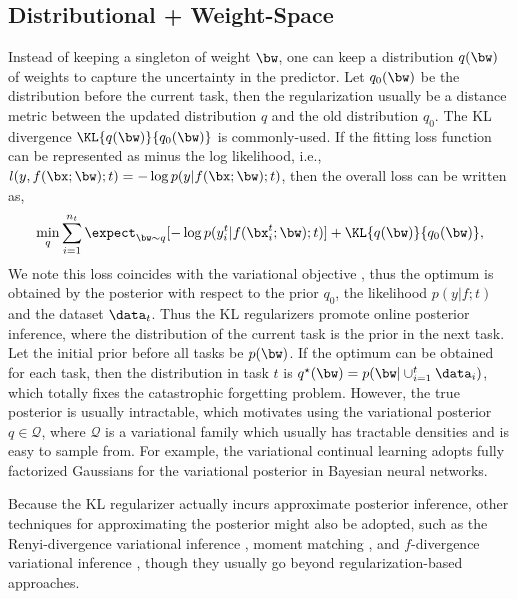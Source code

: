 \subsection{Distributional + Weight-Space}
Instead of keeping a singleton of weight $\bw$, one can keep a distribution $q(\bw)$ of weights to capture the uncertainty in the predictor. Let $q_0(\bw)$ be the distribution before the current task, then the regularization usually be a distance metric between the updated distribution $q$ and the old distribution $q_0$. The KL divergence $\KL{q(\bw)}{q_0(\bw)}$ is commonly-used. If the fitting loss function can be represented as minus the log likelihood, i.e., $l(y, f(\bx; \bw); t) = -\log p(y|f(\bx; \bw); t)$, then the overall loss can be written as,
\begin{align}
    \min_{q} \sum_{i=1}^{n_t} \expect_{\bw \sim q} [ -\log p(y_i^t|f(\bx_i^t; \bw); t) ] + \KL{q(\bw)}{q_0(\bw)},
\end{align}
We note this loss coincides with the variational objective \citep{wainwright2008graphical}, thus the optimum is obtained by the posterior with respect to the prior $q_0$, the likelihood $p(y|f; t)$ and the dataset $\data_t$. Thus the KL regularizers promote online posterior inference, where the distribution of the current task is the prior in the next task. Let the initial prior before all tasks be $p(\bw)$. If the optimum can be obtained for each task, then the distribution in task $t$ is $q^{\star}(\bw) = p(\bw | \cup_{i=1}^t \data_i)$, which totally fixes the catastrophic forgetting problem. However, the true posterior is usually intractable, which motivates using the variational posterior $q \in \mathcal{Q}$, where $\mathcal{Q}$ is a variational family which usually has tractable densities and is easy to sample from. For example, the variational continual learning \citep{nguyen2017variational, swaroop2019improving} adopts fully factorized Gaussians for the variational posterior in Bayesian neural networks. 

Because the KL regularizer actually incurs approximate posterior inference, other techniques for approximating the posterior might also be adopted, such as the Renyi-divergence variational inference \citep{li2016renyi}, moment matching \citep{lee2017overcoming}, and $f$-divergence variational inference \citep{wan2020f}, though they usually go beyond regularization-based approaches. 


